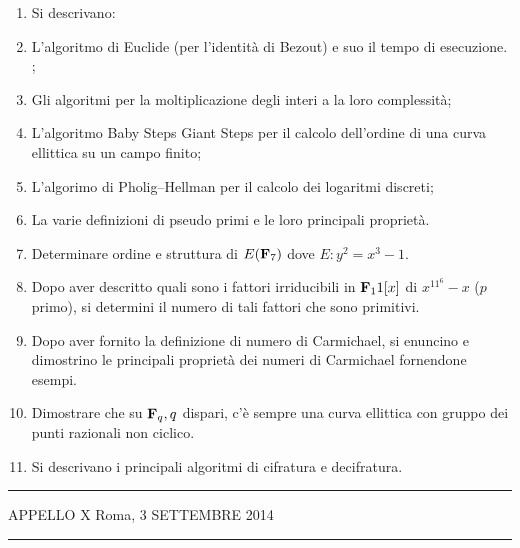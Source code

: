 \documentclass[a4paper,12pt]{article}
\begin{document}
\begin{enumerate}
\item[] Si descrivano:
\item L'algoritmo di Euclide (per l'identit\`a di Bezout) e suo il tempo di esecuzione. ;
\item Gli algoritmi per la moltiplicazione degli interi a la loro complessit\`a;
\item L'algoritmo Baby Steps Giant Steps per il calcolo dell'ordine di una curva ellittica su un campo  finito;
\item L'algorimo di Pholig--Hellman per il calcolo dei logaritmi discreti; 
\item La varie definizioni di pseudo primi e le loro principali propriet\`a.
\item Determinare ordine e struttura di $E({\bf F}_7)$ dove $E: y^2=x^3-1$.
\item Dopo aver descritto quali sono i fattori irriducibili in ${\bf F}_11[x]$ di $x^{11^6}-x$ ($p$ primo), 
si determini il numero di tali fattori che sono primitivi.
\item Dopo aver fornito la definizione di numero di Carmichael, si enuncino e dimostrino le principali propriet\`a
dei numeri di Carmichael fornendone esempi.
\item Dimostrare che su ${\bf F}_q, q$ dispari, c'\`e sempre una curva ellittica con gruppo dei punti razionali non ciclico.
\item Si descrivano i principali algoritmi di cifratura e decifratura.
\end{enumerate}

\hrule\smallskip

\noindent APPELLO X \hfill Roma, 3 SETTEMBRE 2014 

\hrule\smallskip
\end{document}
